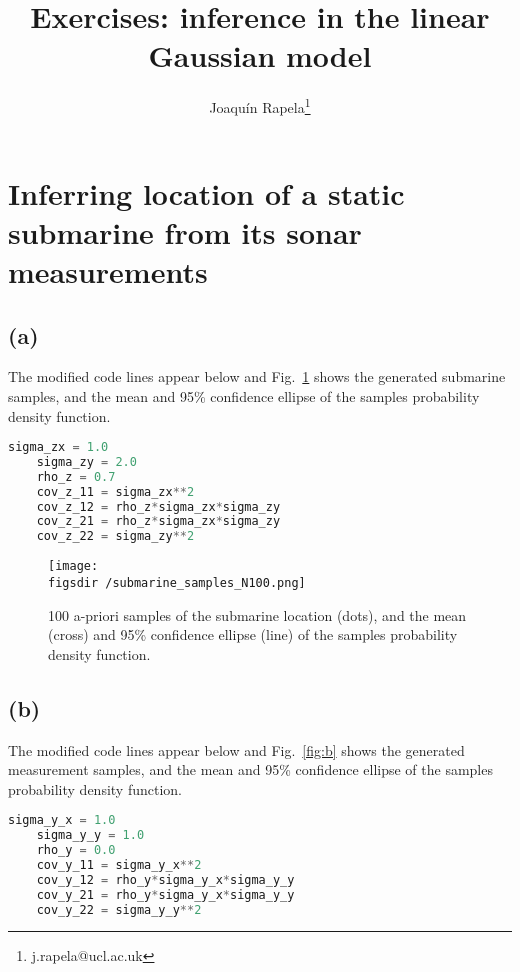 \documentclass[12pt]{article}
\def\figsdir{../../../../../../code/scripts/probability/multivariateGaussians/inferenceInTheLinearGaussianModel/figures/}
\begin{document}
\title{Exercises: inference in the linear Gaussian model}
\author{Joaqu\'{i}n Rapela\thanks{j.rapela@ucl.ac.uk}}

\maketitle

\section{Inferring location of a static submarine from its sonar
measurements}

\subsection*{(a)} The modified code lines appear below and Fig.~\ref{fig:a}
shows the generated submarine samples, and the mean and 95\% confidence ellipse
of the samples probability density function.

\begin{lstlisting}[language=Python]
    sigma_zx = 1.0
    sigma_zy = 2.0
    rho_z = 0.7
    cov_z_11 = sigma_zx**2
    cov_z_12 = rho_z*sigma_zx*sigma_zy
    cov_z_21 = rho_z*sigma_zx*sigma_zy
    cov_z_22 = sigma_zy**2
\end{lstlisting}

\begin{center}
    \begin{figure}[H]
        \texttt{[image: \\figsdir /submarine\_samples\_N100.png]}

        \caption{100 a-priori samples of the submarine location (dots), and the
        mean (cross) and 95\% confidence ellipse (line) of the samples
        probability density function.}

        \label{fig:a}
    \end{figure}
\end{center}

\subsection*{(b)} The modified code lines appear below and Fig.~\ref{fig:b}
shows the generated measurement samples, and the mean and 95\% confidence
ellipse of the samples probability density function.

\begin{lstlisting}[language=Python]
    sigma_y_x = 1.0
    sigma_y_y = 1.0
    rho_y = 0.0
    cov_y_11 = sigma_y_x**2
    cov_y_12 = rho_y*sigma_y_x*sigma_y_y
    cov_y_21 = rho_y*sigma_y_x*sigma_y_y
    cov_y_22 = sigma_y_y**2
\end{lstlisting}
\end{document}
